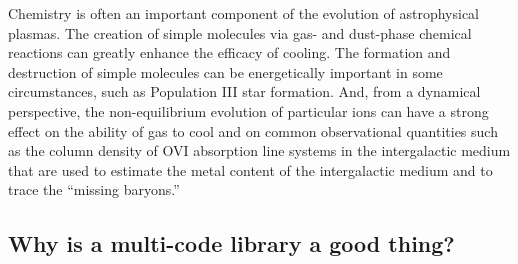 Chemistry is often an important component of the evolution of
astrophysical plasmas.  The creation of simple molecules via gas- and
dust-phase chemical reactions can greatly enhance the efficacy of
cooling. \citep{1979ApJS...41..555H,2005ApJ...626..627O} The formation
and destruction of simple molecules can be energetically important in
some circumstances, such as Population III star formation.
\citep{1998ApJ...508..141O,2002Sci...295...93A,2008MNRAS.388.1627G,2009Sci...325..601T}
And, from a dynamical perspective, the non-equilibrium evolution of
particular ions can have a strong effect on the ability of gas to cool
\citep{1997NewA....2..181A,1997NewA....2..209A} and on common
observational quantities such as the column density of OVI absorption
line systems in the intergalactic medium that are used to estimate the
metal content of the intergalactic medium and to trace the ``missing
baryons.'' \citep{2006ApJ...650..573C,2011ApJ...731....6S,2013MNRAS.434.1043O,2014ApJ...796...49S}


\subsection{Why is a multi-code library a good thing?}
